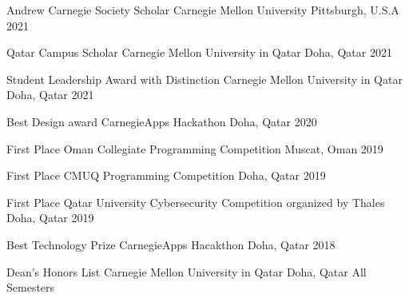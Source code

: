 



\begin{cvhonors}

\cvhonor
    {Andrew Carnegie Society Scholar} %
    {Carnegie Mellon University} %
    {Pittsburgh, U.S.A} %
    {2021} %

\cvhonor
    {Qatar Campus Scholar} %
    {Carnegie Mellon University in Qatar} %
    {Doha, Qatar} %
    {2021} %

\cvhonor
    {Student Leadership Award with Distinction} %
    {Carnegie Mellon University in Qatar} %
    {Doha, Qatar} %
    {2021} %

\cvhonor
    {Best Design award} %
    {CarnegieApps Hackathon } %
    {Doha, Qatar} %
    {2020} %

\cvhonor
    {First Place} %
    {Oman Collegiate Programming Competition} %
    {Muscat, Oman} %
    {2019} %

\cvhonor
    {First Place} %
    {CMUQ Programming Competition} %
    {Doha, Qatar} %
    {2019} %

  \cvhonor
    {First Place} %
    {Qatar University Cybersecurity Competition organized by Thales } %
    {Doha, Qatar} %
    {2019} %

  \cvhonor
    {Best Technology Prize} %
    {CarnegieApps Hacakthon} %
    {Doha, Qatar} %
    {2018} %

  \cvhonor
    {Dean's Honors List} %
    {Carnegie Mellon University in Qatar} %
    {Doha, Qatar} %
    {All Semesters} %

\end{cvhonors}


